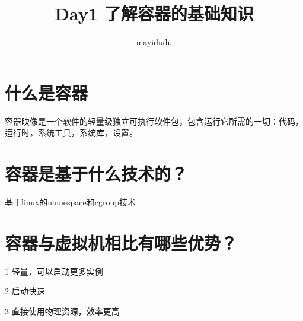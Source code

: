 \documentclass{ctexart}
\begin{document}
\title{Day1 了解容器的基础知识}
\author{mayidudu}
\maketitle


\section{什么是容器}
容器映像是一个软件的轻量级独立可执行软件包，包含运行它所需的一切：代码，运行时，系统工具，系统库，设置。

\section{ 容器是基于什么技术的？}
基于linux的namespace和cgroup技术

\section{ 容器与虚拟机相比有哪些优势？}
1 轻量，可以启动更多实例

2 启动快速

3 直接使用物理资源，效率更高
\end{document}
